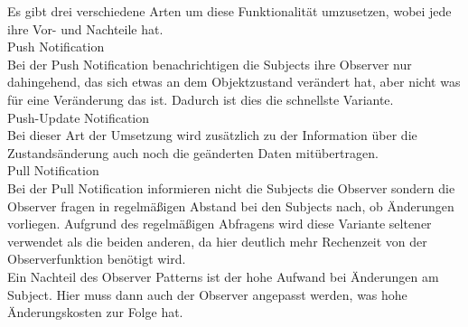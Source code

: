 Es gibt drei verschiedene Arten um diese Funktionalität umzusetzen, wobei jede ihre Vor- und 
Nachteile hat.\\ 
\newline
Push Notification\\
Bei der Push Notification benachrichtigen die Subjects ihre Observer nur dahingehend, das 
sich etwas an dem Objektzustand verändert hat, aber nicht was für eine Veränderung das ist. 
Dadurch ist dies die schnellste Variante.\\
\newline
Push-Update Notification\\
Bei dieser Art der Umsetzung wird zusätzlich zu der Information über die Zustandsänderung
auch noch die geänderten Daten mitübertragen.\\
\newline
Pull Notification\\
Bei der Pull Notification informieren nicht die Subjects die Observer sondern die Observer 
fragen in regelmäßigen Abstand bei den Subjects nach, ob Änderungen vorliegen. Aufgrund des 
regelmäßigen Abfragens wird diese Variante seltener verwendet als die beiden anderen, da hier 
deutlich mehr Rechenzeit von der Observerfunktion benötigt wird.\\
\newline
Ein Nachteil des Observer Patterns ist der hohe Aufwand bei Änderungen am
Subject. Hier muss dann auch der Observer angepasst werden, was hohe Änderungskosten zur
Folge hat.\cite{wikiObserver}

